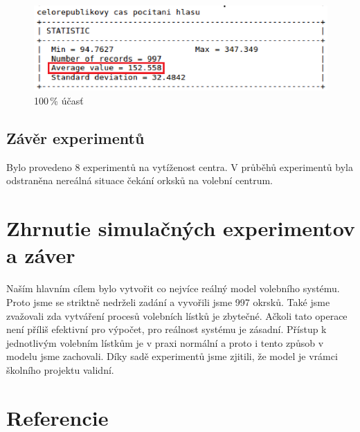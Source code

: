 \documentclass[12pt,a4paper,titlepage,final]{article}
\begin{document}
\begin{figure}[h]

\begin{center}

\includegraphics[scale=0.7]{img/100_cel_poc_rep.eps} 
\caption{100\,\% účasť}
\label{obr6}

\end{center}

\end{figure}
\newline
\newline
\newpage
\subsection{Závěr experimentů}
Bylo provedeno 8 experimentů na vytíženost centra. V průběhů experimentů byla odstraněna nereálná situace čekání orksků na volební centrum.


\section{Zhrnutie simulačných experimentov a záver}
Naším hlavním cílem bylo vytvořit co nejvíce reálný model volebního systému. Proto jsme se striktně nedrželi zadání a vyvořili jsme 997 okrsků. Také jsme zvažovali zda vytváření procesů volebních lístků je zbytečné. Ačkoli tato operace není příliš efektivní pro výpočet, pro reálnost systému je zásadní. Přístup k jednotlivým volebním lístkům je v praxi normální a proto i tento způsob v modelu jsme zachovali.\newline
Díky sadě experimentů jsme zjitili, že model je vrámci školního projektu validní.


\newpage

\section{Referencie}





\newpage
\end{document}
